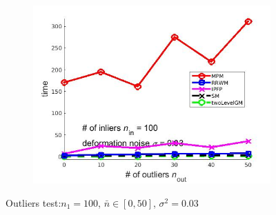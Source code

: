 \documentclass[
	fontsize=12pt,
	paper=a4,
	twoside=false,
	numbers=noenddot,
	plainheadsepline,
	toc=listof,
	toc=bibliography
]{scrartcl}
\begin{document}
\begin{figure}[ht]
\begin{subfigure}[b]{0.3\textwidth}
		\includegraphics[scale=0.25]{"fig_ver2108/syntheticPointSets/outliertest_n50/time_greedy"} 
	\end{subfigure} 	
	\caption{ Outliers test:$n_1=100$, $\bar{n}\in[0,50]$, $\sigma^2=0.03$}
\end{figure}

\FloatBarrier	
\end{document}
